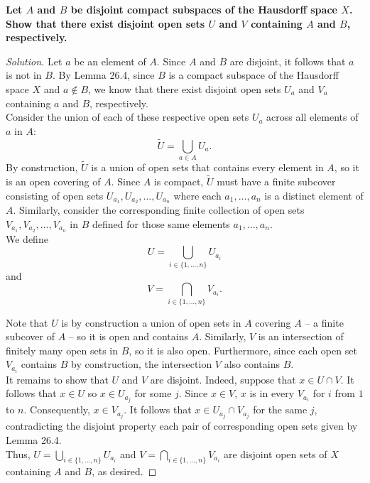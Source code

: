 \documentclass[11pt]{article}
\newenvironment{solution}
  {\renewcommand\qedsymbol{$\blacksquare$}\begin{proof}[Solution]}
  {\end{proof}}
\begin{document}
\textbf{Let $A$ and $B$ be disjoint compact subspaces of the Hausdorff space $X$. Show that there exist disjoint
open sets $U$ and $V$ containing $A$ and $B$, respectively.}

\begin{solution}
Let $a$ be an element of $A$. Since $A$ and $B$ are disjoint, it follows that $a$ is not in $B$. By Lemma 26.4, since 
$B$ is a compact subspace of the Hausdorff space $X$ and $a \notin B$, we know that there exist disjoint open sets $U_a$ and $V_a$ containing $a$ and $B$, respectively. 
\\

Consider the union of each of these respective open sets $U_a$ across all elements of $a$ in $A$:
\[
	\tilde{U} = \bigcup_{a \in A} U_a.
\]
By construction, $\tilde{U}$ is a union of open sets that contains every element in $A$, so it is an open covering of $A$. Since $A$ is compact, $\tilde{U}$ must have a finite
subcover consisting of open sets $U_{a_1}, U_{a_2}, \dots, U_{a_n}$ where each $a_1, \dots, a_n$ is a distinct element of $A$. Similarly, consider the 
corresponding finite collection of open sets $V_{a_1}, V_{a_2}, \dots, V_{a_n}$ in $B$ defined for those same elements $a_1, \dots, a_n$. \\


We define 
\[
	U = \bigcup_{i \in \{ 1, \dots, n \}} U_{a_i}
\]
and 
\[
	V = \bigcap_{i \in \{ 1, \dots, n \}} V_{a_i}.
\]

Note that $U$ is by construction a union of open sets in $A$ covering $A$ -- a finite subcover of $A$ -- so it is open and contains $A$. 
Similarly, $V$ is an intersection of finitely many open sets in $B$, so it is also open. Furthermore, since each open set $V_{a_i}$ contains $B$ by construction, the intersection $V$ also contains $B$. \\

It remains to show that $U$ and $V$ are disjoint. Indeed, suppose that $x \in U \cap V$. It follows that $x \in U$ so $x \in U_{a_j}$ for some $j$. Since $x \in V$, $x$ is in every $V_{a_i}$ for $i$ from $1$ to $n$. Consequently,
$x \in V_{a_j}$. It follows that $x \in U_{a_j} \cap V_{a_j}$ for the same $j$, contradicting the disjoint property each pair of corresponding open sets given by Lemma 26.4. \\

Thus, $U = \bigcup\limits_{i \in \{ 1, \dots, n \}} U_{a_i}$ and $V = \bigcap\limits_{i \in \{ 1, \dots, n \}} V_{a_i}$ are disjoint open sets of $X$ containing $A$ and $B$, as desired.
\end{solution}
\end{document}
